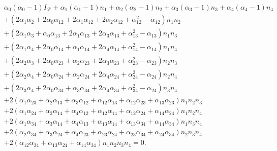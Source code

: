 \documentclass[aps,preprint]{revtex4}%
\begin{document}
\begin{align}
&  \alpha_{0}\left(  \alpha_{0}-1\right)  I_{\mathcal{F}}+\alpha_{1}\left(
\alpha_{1}-1\right)  n_{1}+\alpha_{2}\left(  \alpha_{2}-1\right)  n_{2}%
+\alpha_{3}\left(  \alpha_{3}-1\right)  n_{3}+\alpha_{4}\left(  \alpha
_{4}-1\right)  n_{4}\nonumber\\
&  +\left(  2\alpha_{1}\alpha_{2}+2\alpha_{0}\alpha_{12}+2\alpha_{1}%
\alpha_{12}+2\alpha_{2}\alpha_{12}+\alpha_{12}^{2}-\alpha_{12}\right)
n_{1}n_{2}\nonumber\\
&  +\left(  2\alpha_{1}\alpha_{3}+\alpha_{0}\alpha_{13}+2\alpha_{1}\alpha
_{13}+2\alpha_{3}\alpha_{13}+\alpha_{13}^{2}-\alpha_{13}\right)  n_{1}%
n_{3}\nonumber\\
&  +\left(  2\alpha_{1}\alpha_{4}+2\alpha_{0}\alpha_{14}+\alpha_{1}\alpha
_{14}+2\alpha_{4}\alpha_{14}+\alpha_{14}^{2}-\alpha_{14}\right)  n_{1}%
n_{4}\nonumber\\
&  +\left(  2\alpha_{2}\alpha_{3}+2\alpha_{0}\alpha_{23}+\alpha_{2}\alpha
_{23}+2\alpha_{3}\alpha_{23}+\alpha_{23}^{2}-\alpha_{23}\right)  n_{2}%
n_{3}\nonumber\\
&  +\left(  2\alpha_{2}\alpha_{4}+2\alpha_{0}\alpha_{24}+\alpha_{2}\alpha
_{24}+2\alpha_{4}\alpha_{24}+\alpha_{24}^{2}-\alpha_{24}\right)  n_{2}%
n_{4}\nonumber\\
&  +\left(  2\alpha_{3}\alpha_{4}+2\alpha_{0}\alpha_{34}+\alpha_{3}\alpha
_{34}+2\alpha_{4}\alpha_{34}+\alpha_{34}^{2}-\alpha_{24}\right)  n_{3}%
n_{4}\nonumber\\
&  +2\left(  \alpha_{1}\alpha_{23}+\alpha_{2}\alpha_{13}+\alpha_{3}\alpha
_{12}+\alpha_{12}\alpha_{13}+\alpha_{12}\alpha_{23}+\alpha_{13}\alpha
_{23}\right)  n_{1}n_{2}n_{3}\nonumber\\
&  +2\left(  \alpha_{1}\alpha_{24}+\alpha_{2}\alpha_{14}+\alpha_{4}\alpha
_{12}+\alpha_{12}\alpha_{14}+\alpha_{12}\alpha_{24}+\alpha_{14}\alpha
_{24}\right)  n_{1}n_{2}n_{4}\nonumber\\
&  +2\left(  \alpha_{1}\alpha_{34}+\alpha_{3}\alpha_{14}+\alpha_{4}\alpha
_{13}+\alpha_{13}\alpha_{14}+\alpha_{13}\alpha_{34}+\alpha_{14}\alpha
_{34}\right)  n_{1}n_{3}n_{4}\nonumber\\
&  +2\left(  \alpha_{2}\alpha_{34}+\alpha_{3}\alpha_{24}+\alpha_{4}\alpha
_{23}+\alpha_{23}\alpha_{24}+\alpha_{23}\alpha_{34}+\alpha_{24}\alpha
_{34}\right)  n_{2}n_{3}n_{4}\nonumber\\
&  +2\left(  \alpha_{12}\alpha_{34}+\alpha_{13}\alpha_{24}+\alpha_{14}%
\alpha_{34}\right)  n_{1}n_{2}n_{3}n_{4}=0.
\end{align}
\end{document}
